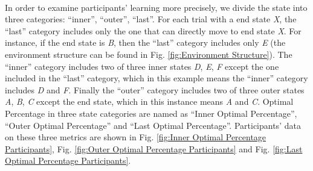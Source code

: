\paragraph{}
In order to examine participants' learning more precisely, we divide the state into three categories: \enquote{inner}, \enquote{outer}, \enquote{last}. For each trial with a end state \emph{X}, the \enquote{last} category includes only the one that can directly move to end state \emph{X}. For instance, if the end state is \emph{B}, then the \enquote{last} category includes only \emph{E} (the environment structure can be found in Fig. \ref{fig:Environment Structure}). The \enquote{inner} category includes two of three inner states \emph{D}, \emph{E}, \emph{F} except the one included in the \enquote{last} category, which in this example means the \enquote{inner} category includes \emph{D} and \emph{F}. Finally the \enquote{outer} category includes two of three outer states \emph{A}, \emph{B}, \emph{C} except the end state, which in this instance means \emph{A} and \emph{C}. Optimal Percentage in three state categories are named as \enquote{Inner Optimal Percentage}, \enquote{Outer Optimal Percentage} and \enquote{Last Optimal Percentage}. Participants' data on these three metrics are shown in Fig. \ref{fig:Inner Optimal Percentage Participants}, Fig. \ref{fig:Outer Optimal Percentage Participants} and Fig. \ref{fig:Last Optimal Percentage Participants}.


